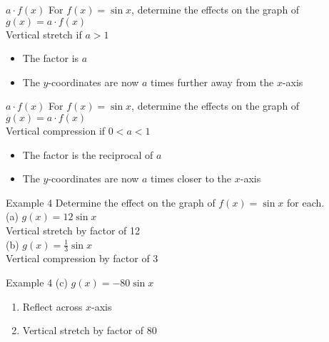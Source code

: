 \documentclass[t,usenames,dvipsnames]{beamer}
\begin{document}
\begin{frame}{$a\cdot f(x)$}
For $f(x) = \sin x$, determine the effects on the graph of $g(x) = a \cdot f(x)$    \newline\\  \pause
Vertical stretch if $a > 1$ \newline\\  \pause
\begin{itemize}
    \item The factor is $a$ \newline\\ \pause
    \item The $y$-coordinates are now $a$ times \alert{further away from} the $x$-axis 
\end{itemize}
\end{frame}

\begin{frame}{$a\cdot f(x)$}
For $f(x) = \sin x$, determine the effects on the graph of $g(x) = a \cdot f(x)$    \newline\\  \pause
Vertical compression if $0 < a < 1$ \newline\\ \pause
\begin{itemize}
    \item The factor is \alert{the reciprocal of} $a$ \newline\\ \pause
    \item The $y$-coordinates are now $a$ times \alert{closer to} the $x$-axis 
\end{itemize}
\end{frame}

\begin{frame}{Example 4}
Determine the effect on the graph of $f(x) = \sin x$ for each.  \newline\\
(a) \quad $g(x) = 12\sin x$ \newline\\  \pause
Vertical stretch by factor of 12 \newline\\ \pause
(b) \quad $g(x) = \frac{1}{3}\sin x$ \newline\\ \pause
Vertical compression by factor of 3
\end{frame}

\begin{frame}{Example 4}
(c) \quad $g(x) = -80\sin x$ \newline\\ \pause
\begin{enumerate}
    \item Reflect across $x$-axis \newline\\ \pause
    \item Vertical stretch by factor of 80
\end{enumerate}
\end{frame}
\end{document}
